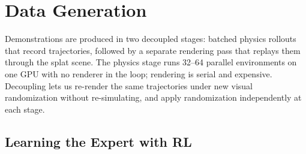 

\section{Data Generation}

Demonstrations are produced in two decoupled stages: batched physics
rollouts that record trajectories, followed by a separate rendering
pass that replays them through the splat scene. The physics stage
runs 32--64 parallel environments on one GPU with no renderer in the
loop; rendering is serial and expensive. Decoupling lets us re-render
the same trajectories under new visual randomization without
re-simulating, and apply randomization independently at each stage.

\subsection{Learning the Expert with RL}

